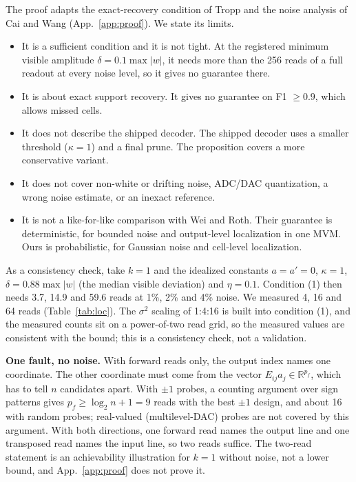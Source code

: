 \documentclass[journal]{IEEEtran}
\begin{document}
The proof adapts the exact-recovery condition of Tropp \cite{tropp2004} and the noise analysis of Cai and Wang \cite{caiwang2011} (App.~\ref{app:proof}). We state its limits.
\begin{itemize}
\item It is a sufficient condition and it is not tight. At the registered minimum visible amplitude $\delta=0.1\max|w|$, it needs more than the 256 reads of a full readout at every noise level, so it gives no guarantee there.
\item It is about exact support recovery. It gives no guarantee on F1 $\ge0.9$, which allows missed cells.
\item It does not describe the shipped decoder. The shipped decoder uses a smaller threshold ($\kappa=1$) and a final prune. The proposition covers a more conservative variant.
\item It does not cover non-white or drifting noise, ADC/DAC quantization, a wrong noise estimate, or an inexact reference.
\item It is not a like-for-like comparison with Wei and Roth. Their guarantee is deterministic, for bounded noise and output-level localization in one MVM. Ours is probabilistic, for Gaussian noise and cell-level localization.
\end{itemize}
As a consistency check, take $k=1$ and the idealized constants $a=a'=0$, $\kappa=1$, $\delta=0.88\max|w|$ (the median visible deviation) and $\eta=0.1$. Condition (1) then needs 3.7, 14.9 and 59.6 reads at 1\%, 2\% and 4\% noise. We measured 4, 16 and 64 reads (Table~\ref{tab:loc}). The $\sigma^2$ scaling of 1:4:16 is built into condition (1), and the measured counts sit on a power-of-two read grid, so the measured values are consistent with the bound; this is a consistency check, not a validation.

\textbf{One fault, no noise.} With forward reads only, the output index names one coordinate. The other coordinate must come from the vector $E_{ij}a_j\in\mathbb R^{p_f}$, which has to tell $n$ candidates apart. With $\pm1$ probes, a counting argument over sign patterns gives $p_f\ge\log_2 n+1=9$ reads with the best $\pm1$ design, and about 16 with random probes; real-valued (multilevel-DAC) probes are not covered by this argument. With both directions, one forward read names the output line and one transposed read names the input line, so two reads suffice. The two-read statement is an achievability illustration for $k=1$ without noise, not a lower bound, and App.~\ref{app:proof} does not prove it.
\end{document}
